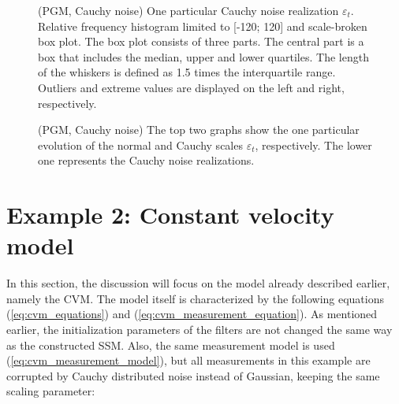\begin{figure}[!ht]
\centering
\caption{(PGM, Cauchy noise) One particular Cauchy noise realization \(\varepsilon_t\). Relative frequency histogram limited to [-120; 120] and scale-broken box plot. The box plot consists of three parts. The central part is a box that includes the median, upper and lower quartiles. The length of the whiskers is defined as 1.5 times the interquartile range. Outliers and extreme values are displayed on the left and right, respectively.}
\label{fig:pgm_measurement_noise_cauchy}
\end{figure}

\begin{figure}[!ht]
\centering
\caption{(PGM, Cauchy noise) The top two graphs show the one particular evolution of the normal and Cauchy scales \(\varepsilon_t\), respectively. The lower one represents the Cauchy noise realizations.}
\label{fig:pgm_abc_scales_evolution_cauchy}
\end{figure}

\section{Example 2: Constant velocity model}
In this section, the discussion will focus on the model already described earlier, namely the CVM. The model itself is characterized by the following equations (\ref{eq:cvm_equations}) and (\ref{eq:cvm_measurement_equation}). As mentioned earlier, the initialization parameters of the filters are not changed the same way as the constructed SSM. Also, the same measurement model is used (\ref{eq:cvm_measurement_model}), but all measurements in this example are corrupted by Cauchy distributed noise instead of Gaussian, keeping the same scaling parameter:

